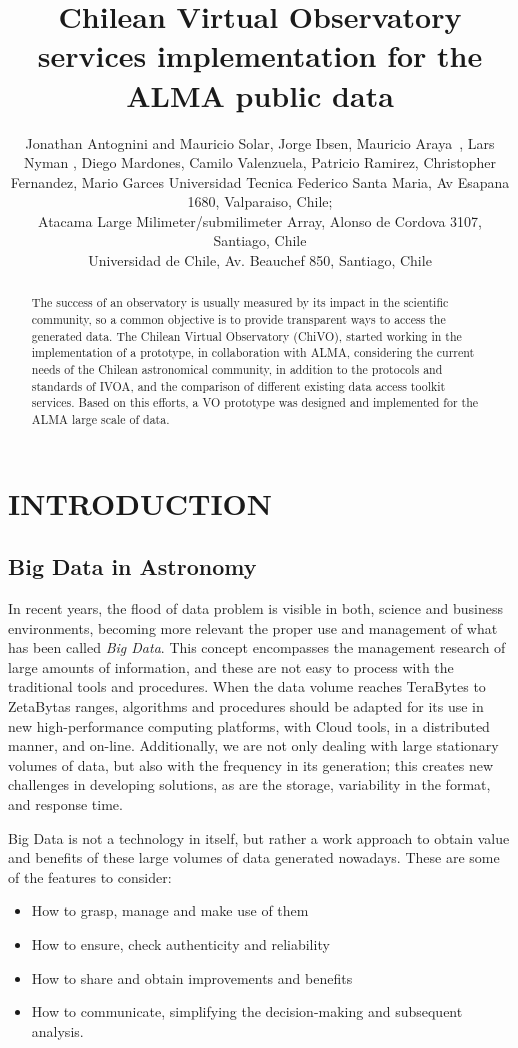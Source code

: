 \documentclass[]{spie}
\title{Chilean Virtual Observatory services implementation for the ALMA public data}
\author{Jonathan Antognini\supit{a} and Mauricio Solar\supit{a}, Jorge Ibsen\supit{b}, Mauricio Araya \supit{a}, 
Lars Nyman \supit{b}, Diego Mardones\supit{c}, Camilo Valenzuela\supit{a}, Patricio Ramirez\supit{a}, 
Christopher Fernandez\supit{a}, Mario Garces\supit{a}
\skiplinehalf
\supit{a}Universidad Tecnica Federico Santa Maria, Av Esapana 1680, Valparaiso, Chile; \\
\supit{b}Atacama Large Milimeter/submilimeter Array, Alonso de Cordova 3107, Santiago, Chile \\
\supit{c}Universidad de Chile, Av. Beauchef 850, Santiago, Chile \\
}
\begin{document}
 
\maketitle 

\begin{abstract}
The success of an observatory is usually measured by its impact in the
scientific community, so a common objective is to provide transparent ways to
access the generated data. The Chilean Virtual Observatory (ChiVO), started
working in the implementation of a prototype, in collaboration with ALMA,
considering the current needs of the Chilean astronomical community, in
addition to the protocols and standards of IVOA, and the comparison of
different existing data access toolkit services. Based on this efforts, a VO
prototype was designed and implemented for the ALMA large scale of data.
\end{abstract}


\section{INTRODUCTION}
\label{sec:intro}  %

\subsection{Big Data in Astronomy}
\label{sec:bdastronomy}
In recent years, the flood of data problem is visible in both, science and
business environments, becoming more relevant the proper use and management of
what has been called \emph{Big Data}. This concept encompasses the management
research of large amounts of information, and these are not easy to process
with the traditional tools and procedures.  When the data volume reaches
TeraBytes to ZetaBytas ranges, algorithms and procedures should be adapted for
its use in new high-performance computing platforms, with Cloud tools, in a
distributed manner, and on-line.  Additionally, we are not only dealing with
large stationary volumes of data, but also with the frequency in its
generation; this creates new challenges in developing solutions, as are the
storage, variability in the format, and response time.  

Big Data is not a technology in itself, but rather a work approach to obtain
value and benefits of these large volumes of data generated nowadays.   These
are some of the features to consider:
\begin{itemize}
\item How to grasp, manage and make use of them
\item How to ensure, check authenticity and reliability
\item How to share and obtain improvements and benefits
\item How to communicate, simplifying the decision-making and subsequent analysis.
\end{itemize}
\end{document}
